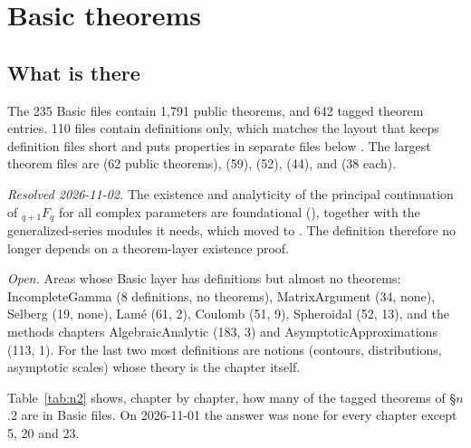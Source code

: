 \documentclass[11pt,a4paper]{article}
\newcommand{\resolved}[1]{\textit{Resolved #1.}}
\newcommand{\open}{\textit{Open.}}
\begin{document}
\section{Basic theorems}\label{sec:theorems}

\subsection{What is there}

The 235 Basic files contain 1{,}791 public theorems, and 642 tagged theorem entries. 110 files
contain definitions only, which matches the layout that keeps definition files short and puts
properties in separate files below . The largest theorem files are
 (62 public theorems), 
(59),  (52),
 (44),
 and
 (38 each).

\resolved{2026-11-02} The existence and analyticity of the principal continuation of
\({}_{q+1}F_q\) for all complex parameters are foundational
(), together with the
generalized-series modules it needs, which moved to . The
definition  therefore no longer depends on a theorem-layer existence
proof.

\open{} Areas whose Basic layer has definitions but almost no theorems: IncompleteGamma (8
definitions, no theorems), MatrixArgument (34, none), Selberg (19, none), Lam\'e (61, 2),
Coulomb (51, 9), Spheroidal (52, 13), and the methods chapters AlgebraicAnalytic (183, 3) and
AsymptoticApproximations (113, 1). For the last two most definitions are notions (contours,
distributions, asymptotic scales) whose theory is the chapter itself.

Table~\ref{tab:n2} shows, chapter by chapter, how many of the tagged theorems of \S\(n\).2 are
in Basic files. On 2026-11-01 the answer was none for every chapter except 5, 20 and 23.
\end{document}
